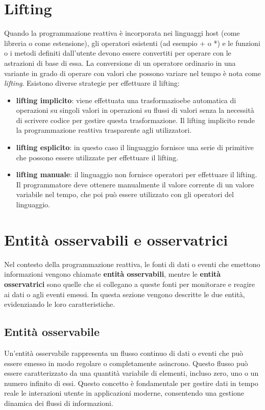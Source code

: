 \documentclass[12pt,a4paper,openright,twoside]{book}
\begin{document}
\section{Lifting}
Quando la programmazione reattiva è incorporata nei linguaggi host (come libreria o come estensione), gli operatori esistenti (ad esempio + o *) e le funzioni o i metodi definiti dall'utente devono essere convertiti per operare con le astrazioni di base di essa. 
La conversione di un operatore ordinario in una variante in grado di operare con valori che possono variare nel tempo è nota come \textit{lifting}. 
Esistono diverse strategie per effettuare il lifting: 
\begin{itemize}
    \item \textbf{lifting implicito}: viene effettuata una trasformazioebe automatica di operazioni su singoli valori in operazioni su flussi di valori senza la necessità di scrivere codice per gestire questa trasformazione. Il lifting implicito rende la programmazione reattiva trasparente agli utilizzatori. 
    \item \textbf{lifting esplicito}: in questo caso il linguaggio fornisce una serie di primitive che possono essere utilizzate per effettuare il lifting.
    \item \textbf{lifting manuale}: il linguaggio non fornisce operatori per effettuare il lifting. Il programmatore deve ottenere manualmente il valore corrente di un valore variabile nel tempo, che poi può essere utilizzato con gli operatori del linguaggio. 
\end{itemize}

\section{Entità osservabili e osservatrici}
Nel contesto della programmazione reattiva, le fonti di dati o eventi che emettono informazioni vengono chiamate \textbf{entità osservabili}, mentre le \textbf{entità osservatrici} sono quelle che si collegano a queste fonti per monitorare e reagire ai dati o agli eventi emessi. In questa sezione vengono descritte le due entità, evidenziando le loro caratteristiche. 
\subsection{Entità osservabile}
Un'entità osservabile rappresenta un flusso continuo di dati o eventi che può essere emesso in modo regolare o completamente asincrono. Questo flusso può essere caratterizzato da una quantità variabile di elementi, incluso zero, uno o un numero infinito di essi. Questo concetto è fondamentale per gestire dati in tempo reale le interazioni utente in applicazioni moderne, consentendo una gestione dinamica dei flussi di informazioni.
\end{document}

